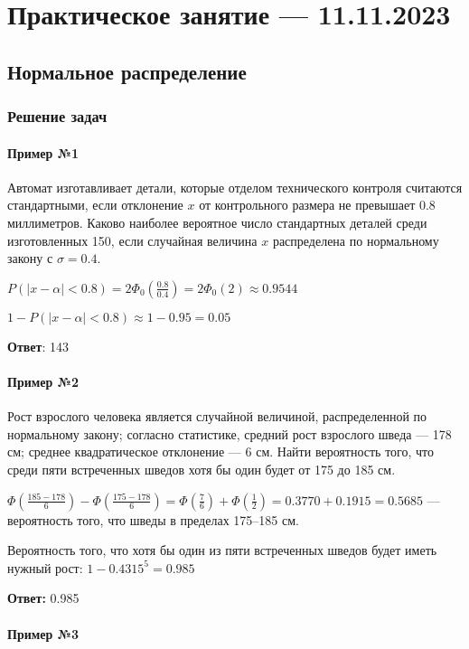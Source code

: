 \documentclass{article}
\begin{document}
\pagebreak
\section{Практическое занятие — 11.11.2023}

\subsection{Нормальное распределение}

\subsubsection{Решение задач}

\paragraph{Пример №1}

Автомат изготавливает детали, которые отделом технического контроля считаются стандартными, если отклонение $x$ от контрольного размера не превышает $0.8$ миллиметров. Каково наиболее вероятное число стандартных деталей среди изготовленных 150, если случайная величина $x$ распределена по нормальному закону с $\sigma = 0.4$.

$P(|x - \alpha| < 0.8) = 2 \Phi_0 (\frac{0.8}{0.4}) = 2 \Phi_0(2) \approx 0.9544$

$1 - P(|x - \alpha| < 0.8) \approx 1 -0.95 = 0.05$

\textbf{Ответ}: 143

\paragraph{Пример №2}

Рост взрослого человека является случайной величиной, распределенной по нормальному закону; согласно статистике, средний рост взрослого шведа — 178 см; среднее квадратическое отклонение — 6 см. Найти вероятность того, что среди пяти встреченных шведов хотя бы один будет от 175 до 185 см.

$\Phi (\frac{185 - 178}{6}) - \Phi (\frac{175 - 178}{6}) = \Phi (\frac{7}{6}) + \Phi (\frac{1}{2}) = 0.3770 + 0.1915 = 0.5685$ — вероятность того, что шведы в пределах 175–185 см.

Вероятность того, что хотя бы один из пяти встреченных шведов будет иметь нужный рост: $1 - 0.4315^5 = 0.985$

\textbf{Ответ:} 0.985

\paragraph{Пример №3}
\end{document}
